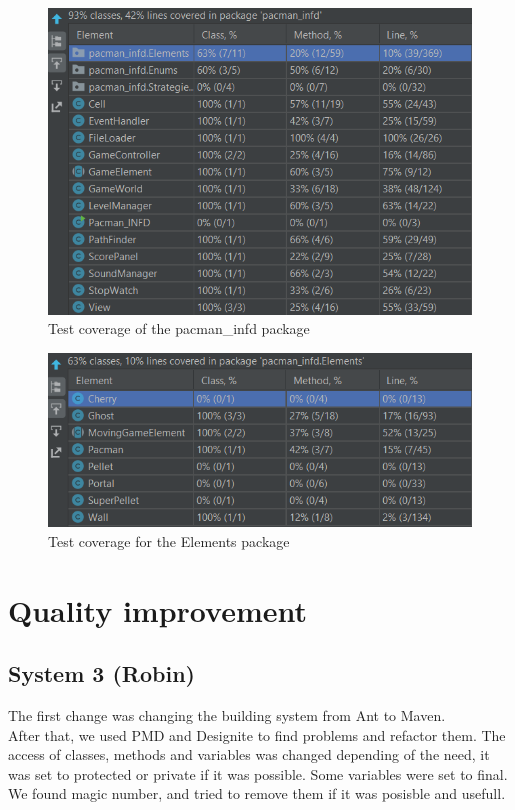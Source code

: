 \documentclass[]{article}
\begin{document}
\begin{figure}[h!]
\centering
\includegraphics[width=0.75\linewidth]{testCov2.png}
\caption{Test coverage of the pacman\_infd package}
\label{fig:S3_test_coverage0}
\end{figure}

\begin{figure}[h!]
\centering
\includegraphics[width=0.75\linewidth]{testCov3.png}
\caption{Test coverage for the Elements package}
\label{fig:S3_test_coverage2}
\end{figure}

\newpage
\clearpage
\section{Quality improvement}

\subsection{System 3 (Robin)}

The first change was changing the building system from Ant to Maven. 
\\

After that, we used PMD and Designite to find problems and refactor them. The access of classes, methods and variables was changed depending of the need, it was set to protected or private if it was possible. Some variables were set to final. We found magic number, and tried to remove them if it was posisble and usefull. 
\\
\end{document}
